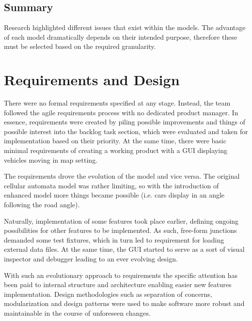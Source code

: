\subsection{Summary}

Research highlighted different issues that exist within the models. The advantage of each model dramatically depends on their intended purpose, therefore these must be selected based on the required granularity.

\section{Requirements and Design}

There were no formal requirements specified at any stage. Instead, the team followed the agile requirements process with no dedicated product manager. In essence, requirements were created by piling possible improvements and things of possible interest into the backlog task section, which were evaluated and taken for implementation based on their priority. At the same time, there were basic minimal requirements of creating a working product with a GUI displaying vehicles moving in map setting.

The requirements drove the evolution of the model and vice versa. The original cellular automata model was rather limiting, so with the introduction of enhanced model more things became possible (i.e. cars display in an angle following the road angle).

Naturally, implementation of some features took place earlier, defining ongoing possibilities for other features to be implemented. As such, free-form junctions demanded some test fixtures, which in turn led to requirement for loading external data files. At the same time, the GUI started to serve as a sort of visual inspector and debugger leading to an ever evolving design.

With such an evolutionary approach to requirements the specific attention has been paid to internal structure and architecture enabling easier new features implementation. Design methodologies such as separation of concerns, modularization and design patterns were used to make software more robust and maintainable in the course of unforeseen changes.

